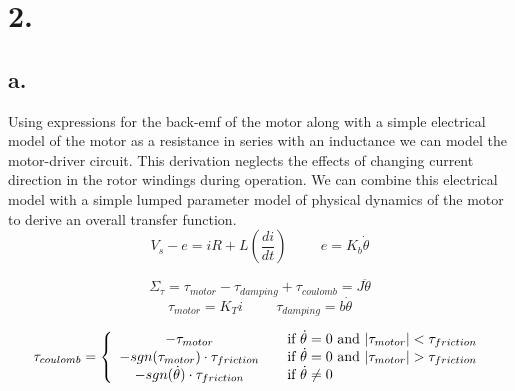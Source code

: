 \documentclass{article}
\theoremstyle{plain}
\theoremstyle{definition}
\theoremstyle{remark}
\begin{document}
\clearpage

\section*{2.}

\subsection*{a.}

Using expressions for the back-emf of the motor along with a simple electrical model of the motor as a resistance in series with an inductance we can model the motor-driver circuit.   This derivation neglects the effects of changing current direction in the rotor windings during operation. We can combine this electrical model with a simple lumped parameter model of physical dynamics of the motor to derive an overall transfer function.  
$$V_{s} - e = iR + L\left(\frac{di}{dt}\right) \hspace{1cm} e = K_{b} \dot{\theta} $$

$$ \Sigma_{\tau} = \tau_{motor} - \tau_{damping} + \tau_{coulomb} = J \ddot{\theta}$$
$$ \tau_{motor} = K_{T}i \hspace{1cm} \tau_{damping} = b \dot{\theta}$$

\[
  \tau_{coulomb} = \left\{
  \begin{array}{c l}
	 - \tau_{motor} & \quad \text{if } \dot{\theta} = 0 \text{ and } |\tau_{motor}| < \tau_{friction} \\
	- sgn(\tau_{motor}) \cdot \tau_{friction} & \quad \text{if } \dot{\theta} = 0 \text{ and } |\tau_{motor}| > \tau_{friction} \\
	- sgn(\dot{\theta}) \cdot \tau_{friction} & \quad \text{if } \dot{\theta} \neq 0 \\
  \end{array} \right.
\]
\end{document}
